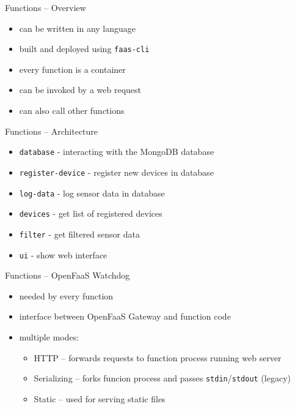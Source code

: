 \begin{frame}{Functions -- Overview}
  \begin{itemize}
    \item can be written in any language
    \item built and deployed using \texttt{faas-cli}
    \item every function is a container
    \item can be invoked by a web request
    \item can also call other functions
  \end{itemize}
\end{frame}

\begin{frame}{Functions -- Architecture}
  \begin{itemize}
    \item \texttt{database} - interacting with the MongoDB database
    \item \texttt{register-device} - register new devices in database
    \item \texttt{log-data} - log sensor data in database
    \item \texttt{devices} - get list of registered devices
    \item \texttt{filter} - get filtered sensor data
    \item \texttt{ui} - show web interface
  \end{itemize}
\end{frame}

\begin{frame}{Functions -- OpenFaaS Watchdog}
  \begin{itemize}
    \item needed by every function
    \item interface between OpenFaaS Gateway and function code
    \item multiple modes:
      \begin{itemize}
        \item HTTP -- forwards requests to function process running web server
        \item Serializing -- forks funcion process and passes \texttt{stdin}/\texttt{stdout} (legacy)
        \item Static -- used for serving static files
      \end{itemize}
  \end{itemize}
\end{frame}

